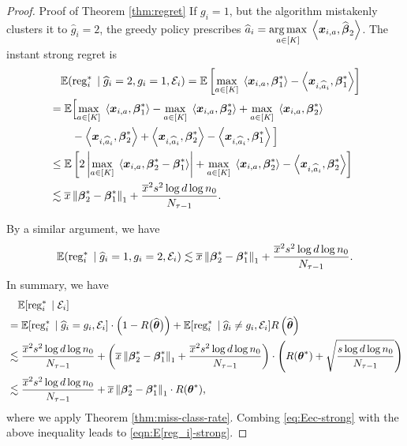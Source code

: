 \begin{proof}{Proof of Theorem \ref{thm:regret}}
If $g_i = 1$, but the algorithm mistakenly clusters it to $\hat g_i = 2$, the greedy policy prescribes
$\widehat a_i = \underset{a\in [K]}{\arg \max}\; \left\langle \boldsymbol{x}_{i,a}, \widehat {\boldsymbol{\beta}}_2 \right\rangle$. 
The instant strong regret is
\begin{equation}\label{eq:51}
	\begin{aligned}
		&\quad \mathbb{E}(\operatorname{reg}^{*}_i \;|\; \widehat g_i = 2, g_i = 1, {\cal E}_i)  =  \mathbb{E}\left[ \underset{a\in [K]}{\max}\; \left\langle \boldsymbol{x}_{i,a}, \boldsymbol{\beta}_1^* \right\rangle - \left\langle \boldsymbol{x}_{i,\widehat a_i}, \boldsymbol{\beta}_1^* \right\rangle \right]  \\
		& = \mathbb{E}\Big[ \underset{a\in [K]}{\max}\; \left\langle \boldsymbol{x}_{i,a}, \boldsymbol{\beta}_1^* \right\rangle - \underset{a\in [K]}{\max}\; \left\langle \boldsymbol{x}_{i,a}, \boldsymbol{\beta}_2^* \right\rangle
		+ \underset{a\in [K]}{\max}\; \left\langle \boldsymbol{x}_{i,a}, \boldsymbol{\beta}_2^* \right\rangle \\
		 &\quad \quad -\left\langle \boldsymbol{x}_{i,\widehat a_i}, \boldsymbol{\beta}^*_2 \right\rangle +\left\langle \boldsymbol{x}_{i,\widehat a_i},\boldsymbol{\beta}^*_2 \right\rangle-\left\langle \boldsymbol{x}_{i,\widehat a_i}, \boldsymbol{\beta}^*_1 \right\rangle\Big]
		\\
		& \le \mathbb{E}\left[ 2\left\lvert\underset{a\in [K]}{\max}\; \left\langle \boldsymbol{x}_{i,a}, \boldsymbol{\beta}_2^* - \boldsymbol{\beta}_1^* \right\rangle\right\rvert 
			+  \underset{a\in [K]}{\max}\; \left\langle \boldsymbol{x}_{i,a}, \boldsymbol{\beta}_2^* \right\rangle-\left\langle \boldsymbol{x}_{i,\widehat a_i}, \boldsymbol{\beta}^*_2 \right\rangle \right] \\
		& \lesssim \overline{x}\left\lVert\boldsymbol{\beta}_2^*-\boldsymbol{\beta}_1^*\right\rVert_1
		+  \frac{\overline{x}^2s^2\log d \log n_0}{N_{\tau-1}}.
	\end{aligned}
\end{equation}

By a similar argument, we have 
\begin{equation}\label{eq:52}
\mathbb{E}(\operatorname{reg}^{*}_i \;|\; \widehat g_i = 1, g_i = 2,{\cal E}_i) \lesssim \overline{x}\left\lVert\boldsymbol{\beta}_2^*-\boldsymbol{\beta}_1^*\right\rVert_1
+  \frac{\overline{x}^2s^2\log d \log n_0}{N_{\tau-1}}.
\end{equation}
In summary, we have
\begin{align*}
&\quad	\mathbb{E}[\operatorname{reg}_i^{*}\;|\; {\cal E}_{i}] \\
& = \mathbb{E}[\operatorname{reg}^{*}_i \;|\; \widehat g_i = g_i, {\cal E}_i] \cdot \left(1-R\big(\widehat{\boldsymbol{\theta}}\big)\right) + \mathbb{E}[\operatorname{reg}^{*}_i \;|\; \widehat g_i \neq g_i, {\cal E}_i] R\left(\widehat{\boldsymbol{\theta}}\right)\\
& \lesssim \frac{\overline{x}^2s^2\log d  \log n_0}{N_{\tau-1}} + \left( \overline{x}\left\lVert\boldsymbol{\beta}_2^* - \boldsymbol{\beta}_1^*\right\rVert_1 +    \frac{\overline{x}^2s^2\log d \log n_0}{N_{\tau-1}}  \right) \cdot \left( R(\boldsymbol{\theta}^*) + \sqrt{\frac{s\log d \log n_0}{N_{\tau-1}}} \right) \\
& \lesssim   \frac{\overline{x}^2s^2\log d  \log n_0}{N_{\tau-1}} + \overline{x} \left\lVert\boldsymbol{\beta}_2^* - \boldsymbol{\beta}_1^*\right\rVert_1\cdot R(\boldsymbol{\theta}^*),
\end{align*}  
where we apply Theorem \ref{thm:miss-class-rate}. Combing \eqref{eq:Eec-strong} with the above inequality leads to \eqref{eqn:E[reg_i]-strong}.


\end{proof}
